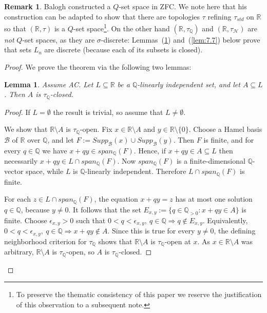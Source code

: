 \documentclass[11pt]{amsart} %
\newtheorem{lemma}[theorem]{Lemma}
\theoremstyle{definition}
\newtheorem{remark}[theorem]{Remark}
\newcommand{\B}{\mathcal{B}}
\newcommand{\R}{\mathbb{R}}
\newcommand{\Q}{\mathbb{Q}}
\newcommand{\AD}{\mathcal{H}}
\begin{document}
\begin{remark} 
Balogh \cite{23} constructed a $Q$-set space in ZFC.  We note here that his construction can be adapted to show that there are topologies $\tau$ refining $\tau_{std}$ on $\R$ so that $(\R,\tau)$ is a $Q$-set space\footnote{To preserve the thematic consistency of this paper we reserve the justification of this observation to a subsequent note.}. On the other hand $(\R,\tau_{\Q})$ and $(\R,\tau_{\AD})$ are \emph{not} $Q$-set spaces, as they are $\sigma$-discrete: Lemmas~(\ref{lem:7.6}) and~(\ref{lem:7.7}) below prove that sets $L_n$ are discrete (because each of its subsets is closed).
\end{remark} 

\begin{proof}
We prove the theorem via the following two lemmas:

\begin{lemma}
\label{lem:7.6}
Assume AC. 
Let $L\subseteq\mathbb{R}$ be a $\mathbb{Q}$-linearly independent set, and let $A\subseteq L$. Then $A$ is $\tau_{\Q}$-closed.
\end{lemma}

\begin{proof}
If $L=\emptyset$ the result is trivial, so assume that $L\neq \emptyset$. 

We show that $\mathbb{R}\setminus A$ is $\tau_{\Q}$-open. Fix $x\in\mathbb{R}\setminus A$ and $y\in\mathbb{R}\setminus\{0\}$. Choose a Hamel basis $\mathcal{B}$ of $\mathbb{R}$ over $\mathbb{Q}$, and let
$F:=Supp_{\B}(x)\cup Supp_{\B}(y).$ 
Then $F$ is finite, and for every $q\in\mathbb{Q}$ we have $x+qy\in span_{\mathbb{Q}}(F).$ 
Hence, if $x+qy\in A\subseteq L$ then necessarily
$x+qy\in L\cap span_{\mathbb{Q}}(F).$ 
Now $span_{\mathbb{Q}}(F)$ is a finite-dimensional $\mathbb{Q}$-vector space, while $L$ is $\mathbb{Q}$-linearly independent. Therefore $L\cap span_{\mathbb{Q}}(F)$ is finite.

For each $z\in L\cap span_{\mathbb{Q}}(F)$, the equation $x+qy=z$ 
has at most one solution $q\in\mathbb{Q}$, because $y\ne0$. It follows that the set
$E_{x,y}:=\{q\in\mathbb{Q}_{>0}:x+qy\in A\}$ 
is finite. Choose $\epsilon_{x,y}>0$ such that
$0<q<\epsilon_{x,y}, \ q\in\mathbb{Q}\Rightarrow q\notin E_{x,y}.$ Equivalently, $0<q<\epsilon_{x,y}, \ q\in\mathbb{Q}\Rightarrow x+qy\notin A.$ 
Since this is true for every $y\ne0$, the defining neighborhood criterion for $\tau_{\Q}$ shows that $\mathbb{R}\setminus A$ is $\tau_{\Q}$-open at $x$. As $x\in\mathbb{R}\setminus A$ was arbitrary, $\mathbb{R}\setminus A$ is $\tau_{\Q}$-open, so $A$ is $\tau_{\Q}$-closed.
\end{proof}


\end{proof}
\end{document}

